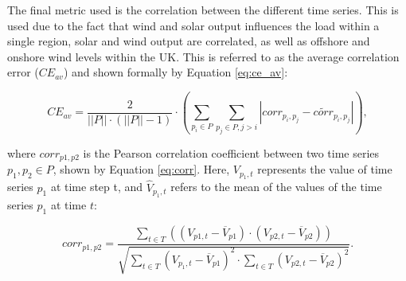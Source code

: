 The final metric used is the correlation between the different time series. This is used due to the fact that wind and solar output influences the load within a single region, solar and wind output are correlated, as well as offshore and onshore wind levels within the UK. This is referred to as the average correlation error ($CE_{av}$) and shown formally by Equation \ref{eq:ce_av}:


\begin{equation}
\label{eq:ce_av}
CE_{av}=\frac{2}{\left|\left|P\right|\right|\cdot(\left|\left|P\right|\right|-1)}\cdot
\left(
\sum\limits_{p_i\in P}\sum\limits_{p_j\in P,j>i}
\left|
corr_{p_i,p_j}-\widetilde{corr}_{p_i,p_j}
\right|
\right),
\end{equation}

\noindent where $corr_{p1,p2}$ is the Pearson correlation coefficient between two time series $p_1,p_2\in P$, shown by Equation \ref{eq:corr}. Here, $V_{p_1,t}$ represents the value of time series $p_1$ at time step t, and $\hat{V}_{p_1,t}$ refers to the mean of the values of the time series $p_1$ at time $t$:

\begin{equation}
\label{eq:corr}
corr_{p1,p2}=\frac
{\sum\limits_{t\in T}\left(\left(V_{p1,t}-\overline{V}_{p1}\right)\cdot\left(V_{p2,t}-\overline{V}_{p2}\right)\right)}
{\sqrt{
		\sum\limits_{t\in T} \left(V_{p_1,t}-\overline{V}_{p1}\right)^2\cdot\sum\limits_{t\in T}\left(V_{p2,t}-\overline{V}_{p2}\right)^2
}}.
\end{equation}













